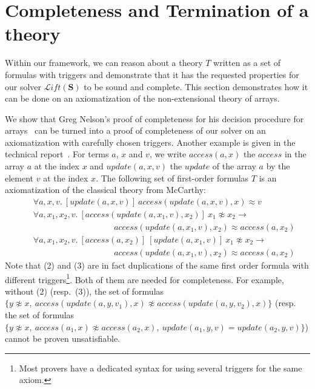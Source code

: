 \documentclass[]{easychair}
\newcommand{\Lift}{{\mathcal{L}\mathit{ift}(\mathbf{S})}}
\newcommand{\update}{\mathit{update}}
\newcommand{\access}{\mathit{access}}
\newcommand{\beforesec}{\vspace{0cm}}
\newcommand{\aftersec}{\vspace{0cm}}
\begin{document}
\beforesec
\section{\label{case-study}Completeness and Termination of a theory}
\aftersec

Within our framework, we can reason about a theory $T$ written as a set of
formulas with triggers and demonstrate that it has the requested properties for
our solver $\Lift$ to be sound and complete. This section demonstrates how it
can be done on an axiomatization of the non-extensional theory of arrays.

\setcounter{equation}{0}
We show that Greg Nelson's
proof of completeness for his decision procedure for
arrays~\cite{nelson-arrays} can be turned into a proof of completeness of our
solver on an axiomatization with carefully chosen triggers.
%
Another example is given in the technical
report~\cite{tech-report}.
For terms $a$, $x$ and $v$,
we write $\access(a,x)$ the $\access$ in the array $a$ at the index $x$ and
$\update(a,x,v)$ the $\update$ of the array $a$ by the element $v$
at the index $x$. The following set of first-order formulas $T$ is an
axiomatization of the classical theory from McCarthy:
\begin{eqnarray}
&&\forall a, x, v.~[\update(a,x,v)]~\access(\update(a,x,v),x)\approx v\\
&&\forall a, x_1, x_2, v.~[\access(\update(a,x_1,v),x_2)]~x_1\not\approx
x_2\to\nonumber \\
&&\hspace{4cm}\access(\update(a,x_1,v),x_2)\approx \access(a,x_2)\\
&&\forall a, x_1,
x_2, v.~[\access(a,x_2)]~[\update(a,x_1,v)]~x_1\not\approx
x_2\to\nonumber \\
&&\hspace{4cm}\access(\update(a,x_1,v),x_2)\approx \access(a,x_2)
\end{eqnarray}
Note that (2) and (3) are in fact duplications of the same first order
formula with different triggers\footnote{Most provers have a dedicated syntax
for using several triggers for the same axiom.}. Both of them are needed for
completeness.
For example, without (2) (resp.~(3)), the set of formulas
$\{y\not\approx x,\ \access(\update(a,y,v_1),x)\not\approx
\access(\update(a,y,v_2),x)\}$ (resp. the set of
formulas $\{y\not\approx x,\ \access(a_1,x)\not\approx\access(a_2,x),\
\update(a_1, y,v)=\update(a_2,y,v)\}$) cannot
be proven unsatisfiable.
\end{document}
